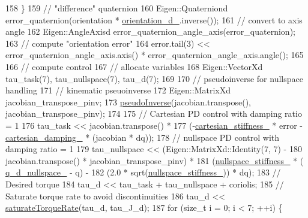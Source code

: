\begin{DoxyCode}
158   \}
159   \textcolor{comment}{// "difference" quaternion}
160   Eigen::Quaterniond error\_quaternion(orientation * \hyperlink{classfranka__example__controllers_1_1CartesianImpedanceExampleController_a8528ed0cf7de6439e65bb1d4c4017137}{orientation\_d\_}.inverse());
161   \textcolor{comment}{// convert to axis angle}
162   Eigen::AngleAxisd error\_quaternion\_angle\_axis(error\_quaternion);
163   \textcolor{comment}{// compute "orientation error"}
164   error.tail(3) << error\_quaternion\_angle\_axis.axis() * error\_quaternion\_angle\_axis.angle();
165 
166   \textcolor{comment}{// compute control}
167   \textcolor{comment}{// allocate variables}
168   Eigen::VectorXd tau\_task(7), tau\_nullspace(7), tau\_d(7);
169 
170   \textcolor{comment}{// pseudoinverse for nullspace handling}
171   \textcolor{comment}{// kinematic pseuoinverse}
172   Eigen::MatrixXd jacobian\_transpose\_pinv;
173   \hyperlink{pseudo__inversion_8h_ad7a75f47179e0fb6ae677c06f1e56a89}{pseudoInverse}(jacobian.transpose(), jacobian\_transpose\_pinv);
174 
175   \textcolor{comment}{// Cartesian PD control with damping ratio = 1}
176   tau\_task << jacobian.transpose() *
177                   (-\hyperlink{classfranka__example__controllers_1_1CartesianImpedanceExampleController_a37535313bb87e462a6c187c7ddce520f}{cartesian\_stiffness\_} * error - 
      \hyperlink{classfranka__example__controllers_1_1CartesianImpedanceExampleController_a95cb6cf998a392f5bf9fa1201f0c595d}{cartesian\_damping\_} * (jacobian * dq));
178   \textcolor{comment}{// nullspace PD control with damping ratio = 1}
179   tau\_nullspace << (Eigen::MatrixXd::Identity(7, 7) -
180                     jacobian.transpose() * jacobian\_transpose\_pinv) *
181                        (\hyperlink{classfranka__example__controllers_1_1CartesianImpedanceExampleController_ac47b4db7d9f39e3d7eac34396b8ff32b}{nullspace\_stiffness\_} * (
      \hyperlink{classfranka__example__controllers_1_1CartesianImpedanceExampleController_a17864b23083e90764168ceb4ea843df8}{q\_d\_nullspace\_} - q) -
182                         (2.0 * sqrt(\hyperlink{classfranka__example__controllers_1_1CartesianImpedanceExampleController_ac47b4db7d9f39e3d7eac34396b8ff32b}{nullspace\_stiffness\_})) * dq);
183   \textcolor{comment}{// Desired torque}
184   tau\_d << tau\_task + tau\_nullspace + coriolis;
185   \textcolor{comment}{// Saturate torque rate to avoid discontinuities}
186   tau\_d << \hyperlink{classfranka__example__controllers_1_1CartesianImpedanceExampleController_a1a3dd73a99d2686af41ff8c5ff8f216c}{saturateTorqueRate}(tau\_d, tau\_J\_d);
187   \textcolor{keywordflow}{for} (\textcolor{keywordtype}{size\_t} i = 0; i < 7; ++i) \{

\end{DoxyCode}
